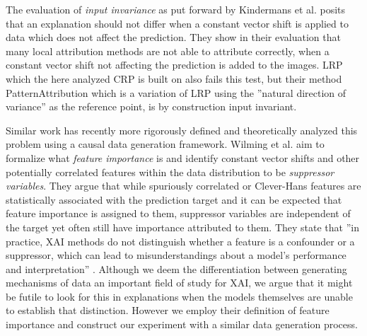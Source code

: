 The evaluation of \textit{input invariance} as put forward by Kindermans et al. \cite{Kindermans2019, Kindermans2017} posits that an explanation should not differ when a constant vector shift is applied to data which does not affect the prediction. They show in their evaluation that many local attribution methods are not able to attribute correctly, when a constant vector shift not affecting the prediction is added to the images. LRP which the here analyzed CRP is built on also fails this test, but their method PatternAttribution which is a variation of LRP using the ''natural direction of variance'' as the reference point, is by construction input invariant.

Similar work has recently more rigorously defined and theoretically analyzed this problem \cite{Wilming2023,Wilming2022, Clark2023} using a causal data generation framework. Wilming et al. \cite{Wilming2022} aim to formalize what \textit{feature importance} is and identify constant vector shifts and other potentially correlated features within the data distribution to be \textit{suppressor variables}.
They argue that while spuriously correlated or Clever-Hans features are statistically associated with the prediction target and it can be expected that feature importance is assigned to them, suppressor variables are independent of the target yet often still have importance attributed to them. They state that ''in practice, XAI methods do not distinguish whether a feature is a confounder or a suppressor, which can lead to misunderstandings about a model's performance and interpretation'' \cite{Wilming2023}. Although we deem the differentiation between generating mechanisms of data an important field of study for XAI, we argue that it might be futile to look for this in explanations when the models themselves are unable to establish that distinction. 
However we employ their definition of feature importance and construct our experiment with a similar data generation process.


